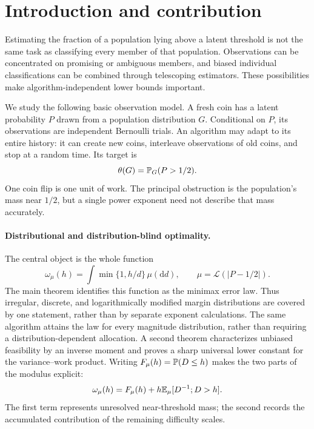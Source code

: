 \section{Introduction and contribution}
Estimating the fraction of a population lying above a latent threshold is
not the same task as classifying every member of that population. Observations
can be concentrated on promising or ambiguous members, and biased individual
classifications can be combined through telescoping estimators. These
possibilities make algorithm-independent lower bounds important.

We study the following basic observation model. A fresh coin has a latent
probability $P$ drawn from a population distribution $G$. Conditional on $P$,
its observations are independent Bernoulli trials. An algorithm may adapt to
its entire history: it can create new coins, interleave observations of old
coins, and stop at a random time. Its target is
\begin{equation}\label{eq:target}
 \theta(G)=\mathbb P_G(P>1/2).
\end{equation}
One coin flip is one unit of work. The principal obstruction is the
population's mass near $1/2$, but a single power exponent need not describe
that mass accurately.

\paragraph{Distributional and distribution-blind optimality.}
The central object is the whole function
\begin{equation}\label{eq:modulus-intro}
 \omega_\mu(h)=\int\min\{1,h/d\}\,\mu(\mathrm d d),
 \qquad \mu=\mathcal L(|P-1/2|).
\end{equation}
The main theorem identifies this function as the minimax error law. Thus
irregular, discrete, and logarithmically modified margin distributions are
covered by one statement, rather than by separate exponent calculations.
The same algorithm attains the law for every magnitude distribution, rather
than requiring a distribution-dependent allocation. A second theorem
characterizes unbiased feasibility by an inverse moment and proves a sharp
universal lower constant for the variance--work product.
Writing $F_\mu(h)=\mathbb P(D\le h)$ makes the two parts of the modulus explicit:
\[
 \omega_\mu(h)=F_\mu(h)+h\mathbb E_\mu[D^{-1};D>h].
\]
The first term represents unresolved near-threshold mass; the second records
the accumulated contribution of the remaining difficulty scales.

